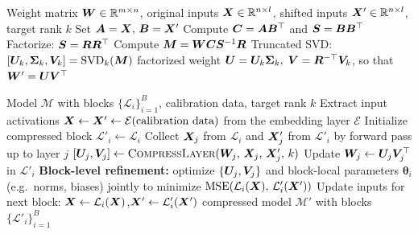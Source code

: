 \documentclass[10pt]{article} %
\theoremstyle{definition}
\theoremstyle{remark}
\newcommand{\ourmethod}{{\textsc{AA-SVD}}}
\begin{document}
\begin{algorithm}[t]
\caption{\textsc{CompressLayer}: \ourmethod~layer-wise low-rank compression}
\label{alg:chol-compression}
\begin{algorithmic}[1]
\REQUIRE Weight matrix ${\bm{W}}\in\mathbb{R}^{m\times n}$,
original inputs ${\bm{X}}\in\mathbb{R}^{n\times l}$, shifted inputs ${\bm{X}}'\in\mathbb{R}^{n\times l}$, target rank $k$
\STATE Set ${\bm{A}} = {\bm{X}},\,{\bm{B}} = {\bm{X}}'$ \hfill{}
\STATE Compute ${\bm{C}} = {\bm{A}}{\bm{B}}^{\top}$ and ${\bm{S}} = {\bm{B}}{\bm{B}}^{\top}$
\STATE Factorize: ${\bm{S}} = {\bm{R}}{\bm{R}}^{\top}$ \hfill{}
\STATE Compute ${\bm{M}} = {\bm{W}}{\bm{C}}{\bm{S}}^{-1}{\bm{R}}$
\STATE Truncated SVD: $[{\bm{U}}_k,{\bm{\Sigma}}_k,{\bm{V}}_k] = \operatorname{SVD}_k({\bm{M}})$
\RETURN factorized weight ${\bm{U}} = {\bm{U}}_k{\bm{\Sigma}}_k,\;{\bm{V}} = {\bm{R}}^{-\top}{\bm{V}}_k$, so that ${\bm{W}}' = {\bm{U}}{\bm{V}}^\top$
\end{algorithmic}
\end{algorithm}

\begin{algorithm}[t]
\caption{\ourmethod: end-to-end block-wise compression with local refinement}
\label{alg:aa-svd-full}
\begin{algorithmic}[1]
\REQUIRE Model $\mathcal{M}$ with blocks $\{\mathcal{L}_i\}_{i=1}^{B}$, calibration data, target rank $k$
\STATE Extract input activations ${\bm{X}} \leftarrow {\bm{X}}' \leftarrow \mathcal{E}(\text{calibration data})$ from the embedding layer $\mathcal{E}$
    \STATE Initialize compressed block $\mathcal{L}'_i \leftarrow \mathcal{L}_i$
        \STATE Collect ${\bm{X}}_j$ from $\mathcal{L}_i$ and ${\bm{X}}'_j$ from $\mathcal{L}'_i$ by forward pass up to layer $j$
        \STATE $[{\bm{U}}_j, {\bm{V}}_j] \leftarrow \textsc{CompressLayer}({\bm{W}}_j,\,{\bm{X}}_j,\,{\bm{X}}'_j,\,k)$
        \STATE Update ${\bm{W}}_j \leftarrow {\bm{U}}_j{\bm{V}}_j^\top$ in $\mathcal{L}'_i$
    \ENDFOR
    \STATE \textbf{Block-level refinement:} optimize $\{{\bm{U}}_j,{\bm{V}}_j\}$ and block-local parameters $\boldsymbol{\theta}_i$ (e.g.\ norms, biases) jointly to minimize $\mathrm{MSE}\!\left(\mathcal{L}_i({\bm{X}}),\,\mathcal{L}'_i({\bm{X}}')\right)$
    \STATE Update inputs for next block: ${\bm{X}} \leftarrow \mathcal{L}_i({\bm{X}})$,\quad ${\bm{X}}' \leftarrow \mathcal{L}'_i({\bm{X}}')$
\ENDFOR
\RETURN compressed model $\mathcal{M}'$ with blocks $\{\mathcal{L}'_i\}_{i=1}^{B}$
\end{algorithmic}
\end{algorithm}
\end{document}
